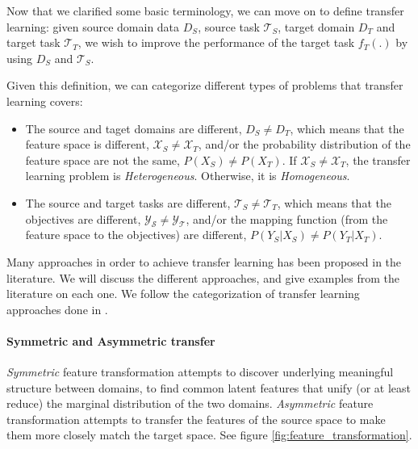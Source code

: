   \par Now that we clarified some basic terminology, we can move on to define transfer learning: given source domain data $D_S$, source task $\mathcal{T}_S$,  target domain $D_T$ and target task $\mathcal{T}_T$, we wish to improve the performance of the target task $f_T(.)$ by using $D_S$ and $\mathcal{T}_S$.

  \par Given this definition, we can categorize different types of problems that transfer learning covers:

  \begin{itemize}
      \item The source and taget domains are different, $D_S \neq D_T$, which means that the feature space is different, $\mathcal{X}_S \neq \mathcal{X}_T$, and/or the probability distribution of the feature space are not the same, $P(X_S) \neq P(X_T)$. If $\mathcal{X}_S \neq \mathcal{X}_T$, the transfer learning problem is \textit{Heterogeneous}. Otherwise, it is \textit{Homogeneous}.

      \item The source and target tasks are different, $\mathcal{T}_S \neq \mathcal{T}_T$, which means that the objectives are different, $\mathcal{Y_S} \neq \mathcal{Y_T}$, and/or the mapping function (from the feature space to the objectives) are different, $P(Y_S|X_S) \neq P(Y_T|X_T)$.
  \end{itemize}

  \par Many approaches in order to achieve transfer learning has been proposed in the literature. We will discuss the different approaches, and give examples from the literature on each one. We follow the categorization of transfer learning approaches done in \citep{weiss2016survey}.

  \paragraph{Symmetric and Asymmetric transfer} \textit{Symmetric} feature transformation attempts to discover underlying meaningful structure between domains, to find common latent features that unify (or at least reduce) the marginal distribution of the two domains. \textit{Asymmetric} feature transformation attempts to transfer the features of the source space to make them more closely match the target space. See figure \ref{fig:feature_transformation}.

